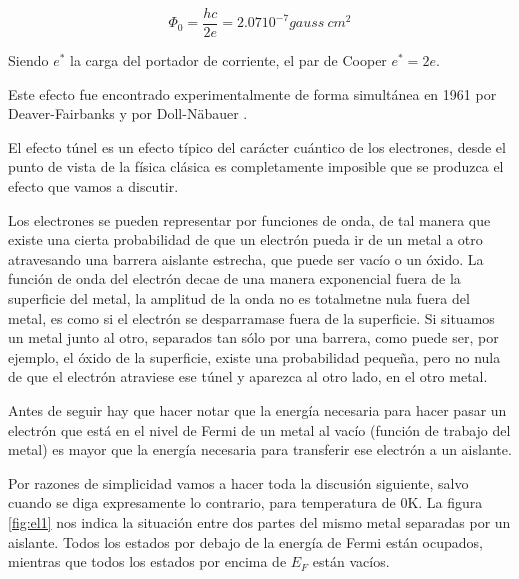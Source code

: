 \begin{equation}
    \Phi_0 = \frac{h c}{2 e} = 2.07 10^{-7} gauss\ cm^2
\end{equation}

Siendo $e^*$ la carga del portador de corriente, el par de Cooper $e^* = 2e$.

Este efecto fue encontrado experimentalmente de forma simultánea en 1961 por Deaver-Fairbanks \cite{deaver} y por Doll-Näbauer \cite{doll}.

El efecto túnel es un efecto típico del carácter cuántico de los electrones, desde el punto de vista de la física clásica es completamente imposible que se produzca el efecto que vamos a discutir.

Los electrones se pueden representar por funciones de onda, de tal manera que existe una cierta probabilidad de que un electrón pueda ir de un metal a otro atravesando una barrera aislante estrecha, que puede ser vacío o un óxido. La función de onda del electrón decae de una manera exponencial fuera de la superficie del metal, la amplitud de la onda no es totalmetne nula fuera del metal, es como si el electrón se desparramase fuera de la superficie. Si situamos un metal junto al otro, separados tan sólo por una barrera, como puede ser, por ejemplo, el óxido de la superficie, existe una probabilidad pequeña, pero no nula de que el electrón atraviese ese túnel y aparezca al otro lado, en el otro metal.

Antes de seguir hay que hacer notar que la energía necesaria para hacer pasar un electrón que está en el nivel de Fermi de un metal al vacío (función de trabajo del metal) es mayor que la energía necesaria para transferir ese electrón a un aislante.

Por razones de simplicidad vamos a hacer toda la discusión siguiente, salvo cuando se diga expresamente lo contrario, para temperatura de 0K. La figura \ref{fig:el1} nos indica la situación entre dos partes del mismo metal separadas por un aislante. Todos los estados por debajo de la energía de Fermi están ocupados, mientras que todos los estados por encima de $E_F$ están vacíos.

